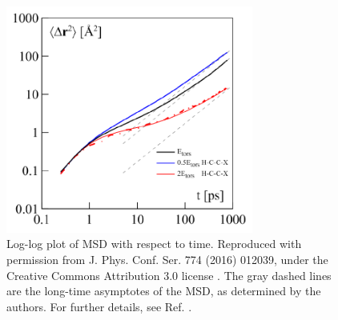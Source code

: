 \documentclass[9pt,bestpractices]{livecoms}
\begin{document}
\begin{figure}[htb!]
	\centering
	\includegraphics[width=3.2in]{KondratyukFig2.png}
	\caption{Log-log plot of MSD with respect to time. Reproduced with permission from J. Phys. Conf. Ser. 774 (2016) 012039, under the Creative Commons Attribution 3.0 license \cite{Kondratyuk2016}. The gray dashed lines are the long-time asymptotes of the MSD, as determined by the authors. For further details, see Ref. \cite{Kondratyuk2016}.}%
	\label{fig:KondratyukFig2}
\end{figure}

%
\end{document}
